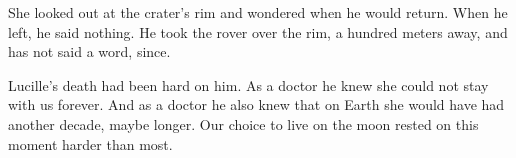 

She looked out at the crater's rim and wondered when he would return.
When he left, he said nothing.  He took the rover over the rim, a
hundred meters away, and has not said a word, since.  

Lucille's death had been hard on him.  As a doctor he knew she could
not stay with us forever.  And as a doctor he also knew that on Earth
she would have had another decade, maybe longer.  Our choice to live
on the moon rested on this moment harder than most.

\bye
